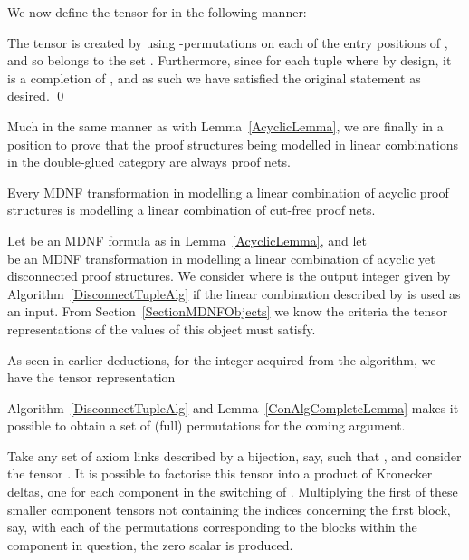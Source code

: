 \documentclass{LMCS}
\theoremstyle{plain}\newtheorem*{cLm}{Claim}
\newcommand{\p}{} \newcommand{\N}{\mathbb{N}}
\begin{document}
    \p We now define the tensor  for  in the following manner:
       
    The tensor is created by using -permutations on each of the entry positions of , and so belongs to the set . Furthermore, since  for each tuple  where  by design, it is a completion of , and as such we have satisfied the original statement as desired. \qed
  


  Much in the same manner as with Lemma~\ref{AcyclicLemma}, we are finally in a position to prove that the proof structures being modelled in linear combinations in the double-glued category are always proof nets.
  
  \begin{prop} \label{ConnectedLemma} Every MDNF transformation in 
    modelling a linear combination of acyclic proof structures is
    modelling a linear combination of cut-free proof nets.
  \end{prop}
  \proof
    Let  be an MDNF formula as in Lemma~\ref{AcyclicLemma}, and let \\  be an MDNF transformation in  modelling a linear
    combination of acyclic yet disconnected proof structures. We consider 
    where  is the output integer given by
    Algorithm~\ref{DisconnectTupleAlg} if the linear combination described by  is used as an input. From
    Section~\ref{SectionMDNFObjects} we know the criteria the tensor
    representations of the values of this object must satisfy.
  
  \p As seen in earlier deductions, for the integer  acquired from the algorithm, we have the tensor representation
    
    Algorithm~\ref{DisconnectTupleAlg} and Lemma~\ref{ConAlgCompleteLemma} makes it possible to obtain a
    set of (full) permutations  for the coming argument.
  
    \p Take any set of axiom links described by a bijection,  say,
    such that , and consider the tensor
    . It is possible to factorise this tensor into a
    product of Kronecker deltas, one for each component in the
    switching of . Multiplying the first of these smaller
    component tensors not containing the indices concerning the first
    block,  say, with
    each of the permutations 
    corresponding to the blocks within the component in question, the zero scalar is produced.
    
\end{document}
